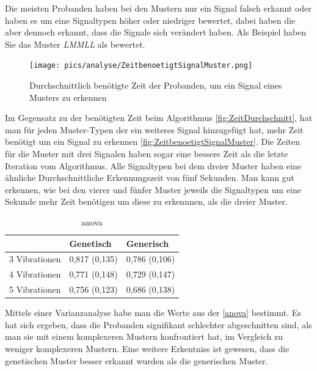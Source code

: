 Die meisten Probanden haben bei den Mustern nur ein Signal falsch erkannt oder haben es um eine Signaltypen höher oder niedriger bewertet, dabei  haben die aber dennoch erkannt, dass die Signale sich verändert haben. Als Beispiel haben Sie das Muster \textit{LMMLL} als  bewertet. \\

\begin{figure}[htbp] 
            \centering
   	\texttt{[image: pics/analyse/ZeitbenoetigtSignalMuster.png]}
	\caption{Durchschnittlich benötigte Zeit der Probanden, um ein Signal eines Musters zu erkennen}
	\label{fig:ZeitbenoetigtSignalMuster}
\end{figure}
Im Gegensatz zu der benötigten Zeit beim Algorithmus \autoref{fig:ZeitDurchschnitt}, hat man für jeden Muster-Typen der ein weiteres Signal hinzugefügt hat, mehr Zeit benötigt um ein Signal zu erkennen \autoref{fig:ZeitbenoetigtSignalMuster}. 
Die Zeiten für die Muster mit drei Signalen haben sogar eine bessere Zeit als die letzte Iteration vom Algorithmus. 
Alle Signaltypen bei dem dreier Muster haben eine ähnliche Durchschnittliche Erkennungszeit von fünf Sekunden.
Man kann gut erkennen, wie bei den vierer und fünfer Muster jeweils die Signaltypen um eine Sekunde mehr Zeit benötigen um diese zu erkennnen, als die dreier Muster.

\begin{table}[]
\centering
\caption{anova}
\label{Erkennungsrate (und Standardabweichung) der Mustertypen. Dabei wurden die Genetischen und Generischen Signale miteinander vergliechen}
\begin{tabular}{l|ll}
              & Genetisch     & Generisch     \\ \hline
3 Vibrationen & 0,817 (0,135) & 0,786 (0,106) \\
4 Vibrationen & 0,771 (0,148) & 0,729 (0,147) \\
5 Vibrationen & 0,756 (0,123) & 0,686 (0,138)
\end{tabular}
\end{table}

Mittels einer Varianzanalyse habe man die Werte aus der \autoref{anova} bestimmt. 
Es hat sich ergeben, dass die Probanden signifikant schlechter abgeschnitten sind, als man sie mit einem komplexeren Mustern konfrontiert hat, im Vergleich zu weniger komplexeren Mustern. 
Eine weitere Erkentniss ist gewesen, dass die genetischen Muster besser erkannt wurden als die generischen Muster.














